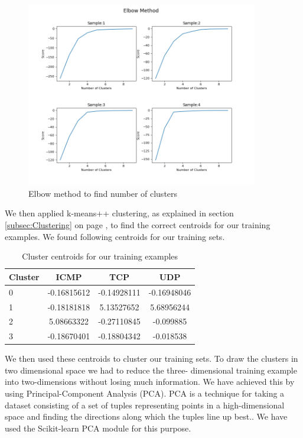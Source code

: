 \documentclass[12pt,oneside,a4paper]{article}
\begin{document}
\begin{figure}[H]
\centering
\includegraphics[width=0.90\textwidth]{elbow-method-applied.png}
\caption{Elbow method to find number of clusters}
\label{fig:elbow-method-applied}
\end{figure}

We then applied k-means++ clustering, as explained in section \ref{subsec:Clustering} on page \pageref{subsec:Clustering}, to find the correct centroids for our training examples. We found following centroids for our training sets.

\begin{table}[H]
\centering
  \begin{tabular}{ l | c  c  c }
    Cluster      & ICMP  & TCP  & UDP \\
    \hline
    0         &{-0.16815612}       &{-0.14928111}    &{-0.16948046} \\
    1         &{-0.18181818}       &{5.13527652}     &{5.68956244} \\
    2         &{5.08663322}        &{-0.27110845}    &{-0.099885} \\
    3         &{-0.18670401}       &{-0.18804342}    &{-0.018538} \\
  \end{tabular}
\caption{Cluster centroids for our training examples} \label{table:centroids}
\end{table}

We then used these centroids to cluster our training sets. To draw the clusters in two dimensional space we had to reduce the three- dimensional training example into two-dimensions without losing much information. We have achieved this by using Principal-Component Analysis (PCA). PCA is a technique for taking a dataset consisting of a set of tuples representing points in a high-dimensional space and finding the directions along which the tuples line up best.\cite{pca}. We have used the Scikit-learn PCA module for this purpose.
\end{document}
